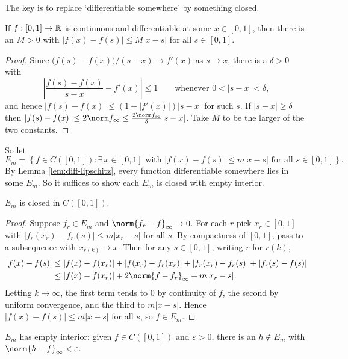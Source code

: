 \documentclass[a4paper]{scrartcl}
\begin{document}
The key is to replace `differentiable somewhere' by something closed.

\begin{lemma}\label{lem:diff-lipschitz}
	If $f : [0,1]\to\mathbb{R}$ is continuous and differentiable at some $x\in[0,1]$, then there is an $M>0$ with $|f(x)-f(s)|\leq M|x-s|$ for all $s\in[0,1]$.
\end{lemma}

\begin{proof}
	Since $\big(f(s)-f(x)\big)/(s-x)\to f'(x)$ as $s\to x$, there is a $\delta>0$ with
	$$\left|\frac{f(s)-f(x)}{s-x}-f'(x)\right|\leq1 \qquad \text{whenever } 0<|s-x|<\delta,$$
	and hence $|f(s)-f(x)|\leq(1+|f'(x)|)|s-x|$ for such $s$. If $|s-x|\geq\delta$ then $|f(s)-f(x)|\leq 2\norm f_\infty \leq \frac{2\norm f_\infty}{\delta}|s-x|$. Take $M$ to be the larger of the two constants.
\end{proof}

So let
$$E_m = \left\{f\in C([0,1]) : \exists\,x\in[0,1] \text{ with } |f(x)-f(s)|\leq m|x-s| \text{ for all } s \in[0,1]\right\}.$$
By Lemma \ref{lem:diff-lipschitz}, every function differentiable somewhere lies in some $E_m$. So it suffices to show each $E_m$ is closed with empty interior.

\begin{lemma}\label{lem:Em-closed}
	$E_m$ is closed in $C([0,1])$.
\end{lemma}

\begin{proof}
	Suppose $f_r\in E_m$ and $\norm{f_r-f}_\infty\to0$. For each $r$ pick $x_r\in[0,1]$ with $|f_r(x_r)-f_r(s)|\leq m|x_r-s|$ for all $s$. By compactness of $[0,1]$, pass to a subsequence with $x_{r(k)}\to x$. Then for any $s\in[0,1]$, writing $r$ for $r(k)$,
	\begin{align*}
		|f(x)-f(s)| &\leq |f(x)-f(x_r)| + |f(x_r)-f_r(x_r)| + |f_r(x_r)-f_r(s)| + |f_r(s)-f(s)| \\
		&\leq |f(x)-f(x_r)| + 2\norm{f-f_r}_\infty + m|x_r-s|.
	\end{align*}
	Letting $k\to\infty$, the first term tends to $0$ by continuity of $f$, the second by uniform convergence, and the third to $m|x-s|$. Hence $|f(x)-f(s)|\leq m|x-s|$ for all $s$, so $f\in E_m$.
\end{proof}

\begin{lemma}\label{lem:Em-nwd}
	$E_m$ has empty interior: given $f\in C([0,1])$ and $\varepsilon>0$, there is an $h\notin E_m$ with $\norm{h-f}_\infty<\varepsilon$.
\end{lemma}
\end{document}
